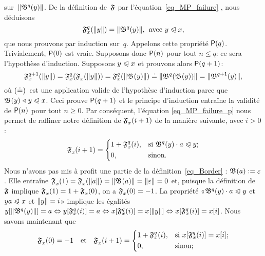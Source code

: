 sur~\(\lVert{\mathfrak{B}^{q}(y)}\rVert{}\). De la définition de~\(\mathfrak{F}\)
par l'équation~\eqref{eq_MP_failure} , nous
déduisons
\begin{equation}
\mathfrak{F}_{x}^{q}(\lVert{y}\rVert{}) = \lVert{\mathfrak{B}^{q}(y)}\rVert{},
\,\; \text{avec \(y \mathrel{\trianglelefteqslant}x\)},
\label{eq_MP_failure_p}
\end{equation}
que nous prouvons par induction sur~\(q\). Appelons cette propriété
\(\textsf{P}({q})\). Trivialement, \(\textsf{P}({0})\) est vraie. Supposons
donc \(\textsf{P}({n})\) pour tout \(n \leqslant q\): ce sera l'hypothèse
d'induction. Supposons \(y \mathrel{\trianglelefteqslant} x\) et prouvons alors
\(\textsf{P}({q+1})\):
\begin{equation*}
  \mathfrak{F}_{x}^{q+1}(\lVert{y}\rVert{})
= \mathfrak{F}_{x}^{q}(\mathfrak{F}_{x}^{}(\lVert{y}\rVert{})) 
= \mathfrak{F}_{x}^{q}(\lVert{\mathfrak{B}^{}(y)}\rVert{})
\doteq \lVert{\mathfrak{B}^{q}(\mathfrak{B}^{}(y))}\rVert{}
= \lVert{\mathfrak{B}^{q+1}(y)}\rVert{},
\end{equation*}
où \((\smash{\doteq})\)~est une application valide de l'hypothèse
d'induction parce que \(\mathfrak{B}^{}(y) \mathrel{\triangleleft} y \mathrel{\trianglelefteqslant} x\). Ceci prouve
\(\textsf{P}({q+1})\) et le principe d'induction entraîne la validité de
\(\textsf{P}({n})\) pour tout \(n \geqslant 0\). Par conséquent,
l'équation \eqref{eq_MP_failure_p} nous permet de raffiner notre
définition de \(\mathfrak{F}_{x}^{}(i+1)\) de la manière suivante, avec
\(i>0\):
\begin{equation*}
\mathfrak{F}_{x}^{}(i+1) =
\left\{
  \begin{aligned}
   & 1 + \mathfrak{F}_{x}^{q}(i),
   && \text{si \(\mathfrak{B}^{q}(y) \cdot a \mathrel{\trianglelefteqslant}y\)};\\
   & 0,
   && \text{sinon.}
  \end{aligned}
\right.
\end{equation*}
Nous n'avons pas mis à profit une partie de la
définition~\eqref{eq_Border} : \({\mathfrak{B}^{}(a) :=
  \varepsilon}\). Elle entraîne \(\mathfrak{F}_{x}^{}(1) =
\mathfrak{F}_{x}^{}(\lVert{a}\rVert{}) = \lVert{\mathfrak{B}^{}(a)}\rVert{} = \lVert{\varepsilon}\rVert{} =
0\) et, puisque la définition de~\(\mathfrak{F}\) implique
\(\mathfrak{F}_{x}^{}(1) = 1 + \mathfrak{F}_{x}^{}(0)\), on a
\(\mathfrak{F}_{x}^{}(0) = -1\). La propriété «\(\mathfrak{B}^{q}(y) \cdot a
\mathrel{\trianglelefteqslant} y\) et \({ya \mathrel{\trianglelefteqslant} x}\) et \({\lVert{y}\rVert{} = i}\)» implique les
égalités \(\smash{{y}[{\lVert{\mathfrak{B}^{q}(y)}\rVert{}}]} = a \Leftrightarrow
\smash{{y}[{\mathfrak{F}_{x}^{q}(i)}]} = a \Leftrightarrow
\smash{{x}[{\mathfrak{F}_{x}^{q}(i)}]} = \smash{{x}[{\lVert{y}\rVert{}}]}
\Leftrightarrow \smash{{x}[{\mathfrak{F}_{x}^{q}(i)}]} =
{x}[{i}]\). Nous savons maintenant que
\begin{equation*}
 \mathfrak{F}_{x}^{}(0)   = -1\quad\text{et}\quad
 \mathfrak{F}_{x}^{}(i+1) =
   \left\{
     \begin{aligned}
       & 1 + \mathfrak{F}_{x}^{q}(i),
       && \text{si \({x}[{\mathfrak{F}_{x}^{q}(i)}] = {x}[{i}]\)};\\
       & 0,
       && \text{sinon;}
     \end{aligned}
   \right.
\end{equation*}
